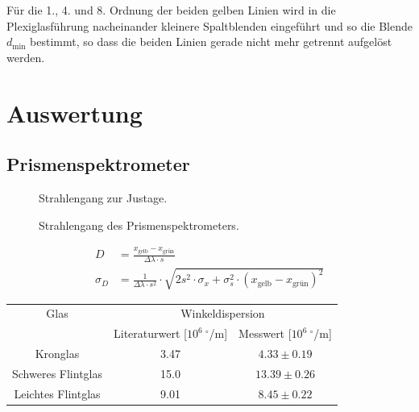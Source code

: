 \documentclass[12pt,a4paper,titlepage,headinclude,bibtotoc]{scrartcl}
\begin{document}
Für die 1., 4. und 8. Ordnung der beiden gelben Linien wird in die Plexiglasführung nacheinander kleinere Spaltblenden eingeführt und so die Blende $d_\text{min}$ bestimmt, so dass die beiden Linien gerade nicht mehr getrennt aufgelöst werden.

\section{Auswertung}
\label{sec:auswertung}

\subsection{Prismenspektrometer}

\begin{figure}[!htb]
	\def\svgwidth{0.8\linewidth}	
	
	\caption{Strahlengang zur Justage.}
\end{figure}


\begin{figure}[!htb]
	\def\svgwidth{0.8\linewidth}
	
	\caption{Strahlengang des Prismenspektrometers.}
\end{figure}

\begin{align}
	D&=\frac{x_\text{gelb} - x_\text{grün}}{\Delta\lambda \cdot s}\\
\sigma_{D}&=\frac{1}{\Delta\lambda \cdot s^{2}} \cdot \sqrt{2s^{2} \cdot \sigma_{x} + \sigma_{s}^{2} \cdot \left(x_\text{gelb} - x_\text{grün}\right)^{2}}
\end{align}


\begin{table}[!htb]
	\centering
	\begin{tabular}{|c||c|c|}
		\hline
		Glas & \multicolumn{2}{c|}{Winkeldispersion}\\		
		 & Literaturwert [$10^6~^\circ$/m] & Messwert [$10^6~^\circ$/m]\\
		\hline
		\hline
		Kronglas& 3.47 & $4.33 \pm 0.19$ \\
		Schweres Flintglas & 15.0 & $13.39 \pm 0.26$ \\
		Leichtes Flintglas & 9.01 & $8.45 \pm 0.22$ \\
		\hline
	\end{tabular}
	\label{tab:Dispersion}
\end{table}
\end{document}
